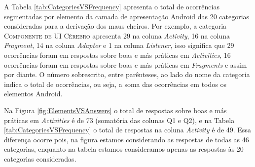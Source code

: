 
A Tabela \ref{tab:CategoriesVSFrequency} apresenta o total de ocorrências segmentadas por elemento da camada de apresentação Android das 20 categorias consideradas para a derivação dos maus cheiros. Por exemplo, a categoria \textsc{\small Componente de UI Cérebro} apresenta 29 na coluna \textit{Activity}, 16 na coluna \textit{Fragment}, 14 na coluna \textit{Adapter} e 1 na coluna \textit{Listener}, isso significa que 29 ocorrências foram em respostas sobre boas e más práticas em \textit{Activities}, 16 ocorrências foram em respostas sobre boas e más práticas em \textit{Fragments} e assim por diante. O número sobrescrito, entre parênteses, ao lado do nome da categoria indica o total de ocorrências, ou seja, a soma das ocorrências em todos os elementos Android.

Na Figura \ref{fig:ElementsVSAnswers} o total de respostas sobre boas e más práticas em \textit{Activities} é de 73 (somatória das colunas Q1 e Q2), e na Tabela \ref{tab:CategoriesVSFrequency} o total de respostas na coluna \textit{Activity} é de 49. Essa diferença ocorre pois, na figura estamos considerando as respostas de todas as 46 categorias, enquanto na tabela estamos consideramos apenas as respostas às 20 categorias consideradas.

